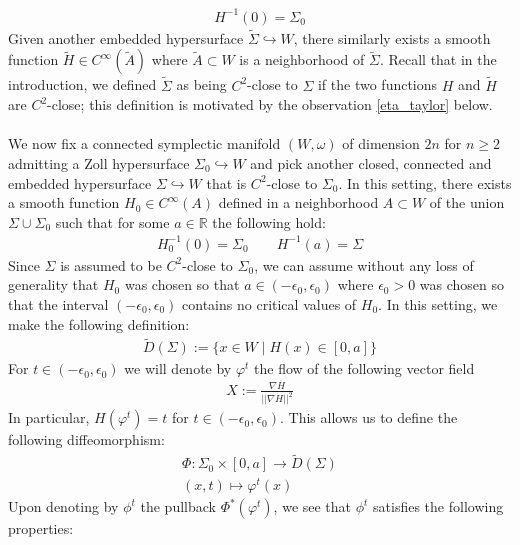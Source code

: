 \documentclass[11pt]{amsart}
\theoremstyle{plain}
\theoremstyle{definition}
\theoremstyle{remark}
\begin{document}
\begin{align}
    H^{-1}(0)= \Sigma_0
\end{align}
Given another embedded hypersurface $\tilde \Sigma \hookrightarrow W$, there similarly exists a smooth function $\tilde H \in C^{\infty}(\tilde A)$ where $\tilde A \subset W$ is a neighborhood of $\tilde \Sigma$. Recall that in the introduction, we defined $\tilde \Sigma$ as being $C^2$-close to $\Sigma$ if the two functions $H$ and $\tilde H$ are $C^2$-close; this definition is motivated by the observation \eqref{eta_taylor} below.\\
\\
We now fix a connected symplectic manifold $(W,\omega)$ of dimension $2n$ for $n\geq 2$ admitting a Zoll hypersurface $\Sigma_0 \hookrightarrow W$ and pick another closed, connected and embedded hypersurface $\Sigma \hookrightarrow W$ that is $C^2$-close to $\Sigma_0$. In this setting, there exists a smooth function $H_0 \in C^{\infty}(A)$ defined in a neighborhood $A \subset W$ of the union $\Sigma \cup \Sigma_0$ such that for some $a \in \mathbb{R}$ the following hold:
\begin{align}
    H^{-1}_0(0) = \Sigma_0 \qquad H^{-1}(a) = \Sigma
\end{align}
Since $\Sigma$ is assumed to be $C^2$-close to $\Sigma_0$, we can assume without any loss of generality that $H_0$ was chosen so that $a \in (-\epsilon_0,\epsilon_0)$ where $\epsilon_0>0$ was chosen so that the interval $(-\epsilon_0,\epsilon_0)$ contains no critical values of $H_0$. In this setting, we make the following definition:
\begin{align}\label{D(Sigma)_region_def}
  \tilde D(\Sigma):= \{x \in W\;\big|\; H(x)\in[0,a] \}
\end{align} 
For $ t \in (-\epsilon_0,\epsilon_0)$ we will denote by $\varphi^{t}$ the flow of the following vector field
\begin{align}
    X:= \frac{\nabla H}{\vert\vert \nabla H\vert\vert^2}
\end{align}
In particular, $H(\varphi^t)=t$ for $t \in (-\epsilon_0,\epsilon_0)$. This allows us to define  the following diffeomorphism:
\begin{align}\label{hyp_def_of_Phi}
   \Phi:  \Sigma_0 \times  [0,a] \longrightarrow \tilde D(\Sigma)\\\nonumber
    (x,t)\longmapsto \varphi^t(x)
\end{align}
Upon denoting by $\phi^t$ the pullback $\Phi^*(\varphi^t)$, we see that $\phi^t$ satisfies the following properties:
\end{document}

